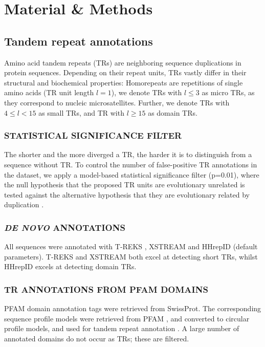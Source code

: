 \documentclass[a4,center,fleqn]{NAR}
\begin{document}
\section{Material \& Methods}
\subsection{Tandem repeat annotations}
Amino acid tandem repeats (TRs) are neighboring sequence duplications in protein sequences. Depending on their repeat units, TRs vastly differ in their structural and biochemical properties: Homorepeats are repetitions of single amino acids (TR unit length $l=1$),
we denote TRs with $l\leq3$ as micro TRs, as they correspond to nucleic microsatellites. Further, we denote TRs with $4\leq l<15$ as small TRs, and TR with $l\geq15$ as domain TRs.

\subsubsection{\MakeUppercase{Statistical significance filter}}
The shorter and the more diverged a TR, the harder it is to distinguish from a sequence without TR. To control the number of false-positive TR annotations in the dataset, we apply a model-based statistical significance filter (p=0.01), where the null hypothesis that the proposed TR units are evolutionary unrelated is tested against the alternative hypothesis that they are evolutionary related by duplication \cite{Schaper2012}.

\subsubsection{\MakeUppercase{\textit{de novo} annotations}}
All sequences were annotated with T-REKS \cite{Jorda2009}, XSTREAM \cite{Newman2007} and HHrepID \cite{Biegert2008} (default parameters).
T-REKS and XSTREAM both excel at detecting short TRs, whilst HHrepID excels at detecting domain TRs.

\subsubsection{\MakeUppercase{TR annotations from PFAM domains}}
PFAM domain annotation tags were retrieved from SwissProt. The corresponding sequence profile models were retrieved from PFAM \cite{Finn2015}, and converted to circular profile models, and used for tandem repeat annotation \cite{Schaper2014}. A large number of annotated domains do not occur as TRs; these are filtered.
\end{document}
